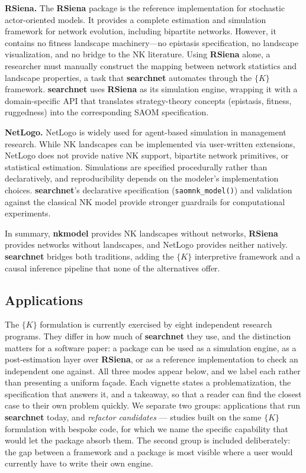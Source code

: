 \documentclass[
]{article}
\newcounter{none} %
\begin{document}
\textbf{\textbf{RSiena}.} The \textbf{RSiena} package \citep{Ripley2022}
is the reference implementation for stochastic actor-oriented models. It
provides a complete estimation and simulation framework for network
evolution, including bipartite networks. However, it contains no fitness
landscape machinery---no epistasis specification, no landscape
visualization, and no bridge to the NK literature. Using \textbf{RSiena}
alone, a researcher must manually construct the mapping between network
statistics and landscape properties, a task that \textbf{searchnet}
automates through the \(\{K\}\) framework. \textbf{searchnet} uses
\textbf{RSiena} as its simulation engine, wrapping it with a
domain-specific API that translates strategy-theory concepts (epistasis,
fitness, ruggedness) into the corresponding SAOM specification.

\textbf{NetLogo.} NetLogo \citep{Wilensky1999} is widely used for
agent-based simulation in management research. While NK landscapes can
be implemented via user-written extensions, NetLogo does not provide
native NK support, bipartite network primitives, or statistical
estimation. Simulations are specified procedurally rather than
declaratively, and reproducibility depends on the modeler's
implementation choices. \textbf{searchnet}'s declarative specification
(\texttt{saomnk\_model()}) and validation against the classical NK model
provide stronger guardrails for computational experiments.

In summary, \textbf{nkmodel} provides NK landscapes without networks,
\textbf{RSiena} provides networks without landscapes, and NetLogo
provides neither natively. \textbf{searchnet} bridges both traditions,
adding the \(\{K\}\) interpretive framework and a causal inference
pipeline that none of the alternatives offer.

\subsection{Applications}\label{sec:applications}

The \(\{K\}\) formulation is currently exercised by eight independent
research programs. They differ in how much of \textbf{searchnet} they
use, and the distinction matters for a software paper: a package can be
used as a simulation engine, as a post-estimation layer over
\textbf{RSiena}, or as a reference implementation to check an
independent one against. All three modes appear below, and we label each
rather than presenting a uniform façade. Each vignette states a
problematization, the specification that answers it, and a takeaway, so
that a reader can find the closest case to their own problem quickly. We
separate two groups: applications that run \textbf{searchnet} today, and
\emph{refactor candidates} --- studies built on the same \(\{K\}\)
formulation with bespoke code, for which we name the specific capability
that would let the package absorb them. The second group is included
deliberately: the gap between a framework and a package is most visible
where a user would currently have to write their own engine.
\end{document}
